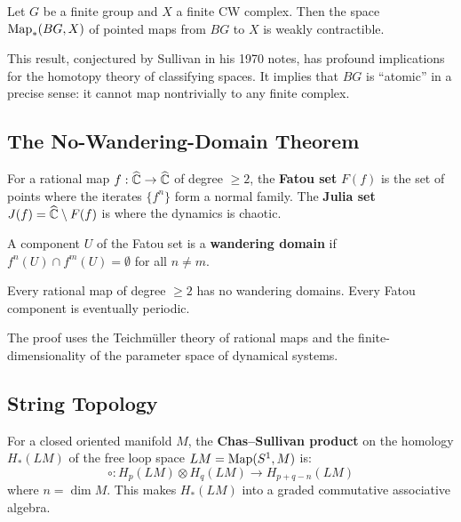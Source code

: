 \begin{theorem}
Let $G$ be a finite group and $X$ a finite CW complex. Then the space $\operatorname{Map}_*(BG, X)$ of pointed maps from $BG$ to $X$ is weakly contractible.
\end{theorem}

This result, conjectured by Sullivan in his 1970 notes, has profound implications for the homotopy theory of classifying spaces. It implies that $BG$ is ``atomic'' in a precise sense: it cannot map nontrivially to any finite complex.

\subsection{The No-Wandering-Domain Theorem}

\begin{definition}
For a rational map $f: \widehat{\mathbb{C}} \to \widehat{\mathbb{C}}$ of degree $\geq 2$, the \textbf{Fatou set} $F(f)$ is the set of points where the iterates $\{f^n\}$ form a normal family. The \textbf{Julia set} $J(f) = \widehat{\mathbb{C}} \setminus F(f)$ is where the dynamics is chaotic.
\end{definition}

\begin{definition}
A component $U$ of the Fatou set is a \textbf{wandering domain} if $f^n(U) \cap f^m(U) = \emptyset$ for all $n \neq m$.
\end{definition}

\begin{theorem}[Sullivan, 1985]
Every rational map of degree $\geq 2$ has no wandering domains. Every Fatou component is eventually periodic.
\end{theorem}

The proof uses the Teichm\"uller theory of rational maps and the finite-dimensionality of the parameter space of dynamical systems.

\subsection{String Topology}

\begin{definition}
For a closed oriented manifold $M$, the \textbf{Chas--Sullivan product} on the homology $H_*(LM)$ of the free loop space $LM = \operatorname{Map}(S^1, M)$ is:
\[
\circ: H_p(LM) \otimes H_q(LM) \to H_{p+q-n}(LM)
\]
where $n = \dim M$. This makes $H_*(LM)$ into a graded commutative associative algebra.
\end{definition}

